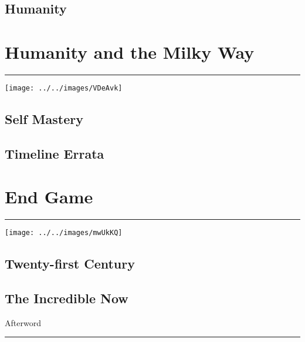 \documentclass[letterpaper,11pt,twoside,onecolumn,openany]{book}
\begin{document}
	\chapter{Humanity}
	
	
	
	
	\part{Humanity and the Milky Way}
	
	\thispagestyle{empty}
	\hrule
	\vspace{40mm}
	\begin{center}
		\texttt{[image: ../../images/VDeAvk]}
	\end{center}
	
	
	\chapter{Self Mastery}
	
	\chapter{Timeline Errata}
	
	
	
	\part{End Game}
	
	\thispagestyle{empty}
	\hrule
	\vspace{40mm}
	\begin{center}
		\texttt{[image: ../../images/mwUkKQ]}
	\end{center}
	
	\chapter{Twenty-first Century}
	
	\chapter{The Incredible Now}
	
	
	\newpage
	
	\begin{center}
		\huge{Afterword}
	\end{center}
	\hrule
	
	
	
	\newpage
	
\end{document}
